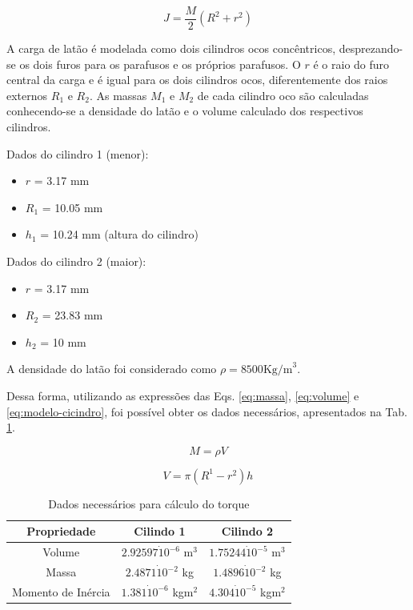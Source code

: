 \begin{equation}
    J = \frac{M}{2}(R^2 + r^2)
    \label{eq:modelo-cilindro}
\end{equation}

A carga de latão é modelada como dois cilindros ocos concêntricos, desprezando-se os dois furos para os parafusos e os próprios parafusos. O $r$ é o raio do furo central da carga e é igual para os dois cilindros ocos, diferentemente dos raios externos $R_1$ e $R_2$. As massas $M_1$ e $M_2$ de cada cilindro oco são calculadas conhecendo-se a densidade do latão e o volume calculado dos respectivos cilindros.

\noindent Dados do cilindro 1 (menor):

\begin{itemize}
    \item $r$ = 3.17 mm
    \item $R_1$ = 10.05 mm
    \item $h_1$ = 10.24 mm (altura do cilindro)
\end{itemize}

\noindent Dados do cilindro 2 (maior):

\begin{itemize}
    \item $r$ = 3.17 mm
    \item $R_2$ = 23.83 mm
    \item $h_2$ = 10 mm
\end{itemize}

\noindent A densidade do latão foi considerado como $\rho = 8500 \text{Kg/m}^3$.

Dessa forma, utilizando as expressões das Eqs. \ref{eq:massa}, \ref{eq:volume} e \ref{eq:modelo-cicindro}, foi possível obter os dados necessários, apresentados na Tab. \ref{tab:tab-dados-inercias}.

\begin{equation}
M = \rho V
    \label{eq:massa}
\end{equation}

\begin{equation}
V = \pi (R^1 - r^2)h
    \label{eq:volume}
\end{equation}

\begin{table}[H]
    \centering
    \caption{Dados necessários para cálculo do torque}
    \begin{tabular}{|c|c|c|}\hline
        Propriedade&Cilindo 1&Cilindo 2\\\hline
        Volume& $2.92597\dot10^{-6}$ m$^3$ &$1.75244\dot10^{-5}$ m$^3$\\\hline
        Massa&$2.4871\dot 10^{-2}$ kg&$1.4896\dot 10^{-2}$ kg\\\hline 
        Momento de Inércia&$1.381\dot10^{-6}$ kgm$^2$ &$ 4.304\dot10^{-5}$ kgm$^2$\\\hline
    \end{tabular}
    \label{tab:tab-dados-inercias}
\end{table}

